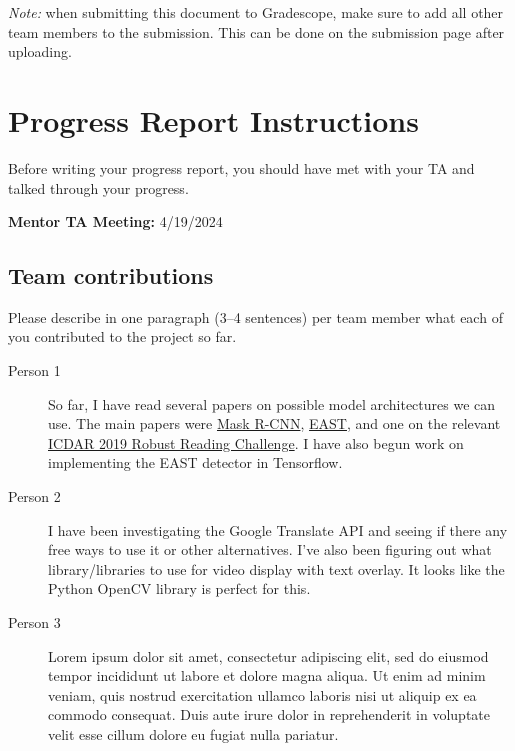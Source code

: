 \emph{Note:} when submitting this document to Gradescope, make sure to add all other team members to the submission. This can be done on the submission page after uploading.

\section*{Progress Report Instructions}

Before writing your progress report, you should have met with your TA and talked through your progress.

\textbf{Mentor TA Meeting:} 4/19/2024

\subsection*{Team contributions}

Please describe in one paragraph (3--4 sentences) per team member what each of you contributed to the project so far.
\begin{description}

\item[Person 1] So far, I have read several papers on possible model architectures we can use. The main papers were \href{http://arxiv.org/abs/2206.00311}{Mask R-CNN}, \href{https://arxiv.org/pdf/1704.03155.pdf}{EAST}, and one on the relevant \href{https://arxiv.org/pdf/1907.00945.pdf}{ICDAR 2019 Robust Reading Challenge}. I have also begun work on implementing the EAST detector in Tensorflow.

\item[Person 2] I have been investigating the Google Translate API and seeing if there any free ways to use it or other alternatives. I've also been figuring out what library/libraries to use for video display with text overlay. It looks like the Python OpenCV library is perfect for this.

\item [Person 3] Lorem ipsum dolor sit amet, consectetur adipiscing elit, sed do eiusmod tempor incididunt ut labore et dolore magna aliqua. Ut enim ad minim veniam, quis nostrud exercitation ullamco laboris nisi ut aliquip ex ea commodo consequat. Duis aute irure dolor in reprehenderit in voluptate velit esse cillum dolore eu fugiat nulla pariatur. 

\end{description}

